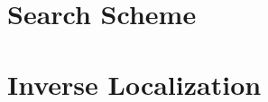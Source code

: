 \documentclass[10pt, conference, letterpaper]{IEEEtran}
\newcommand{\mynote}[1]{{$\langle${\textbf{\textcolor{blue}{#1}}}$\rangle$}}
\begin{document}





\section{Search Scheme}
\label{sec:search}


\section{Inverse Localization}
\label{sec:inverse}


%
\end{document}
